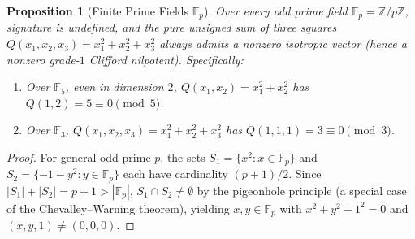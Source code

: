 \documentclass[11pt]{article}
\newtheorem{proposition}[theorem]{Proposition}
\theoremstyle{definition}
\newcommand{\F}{\mathbb{F}}
\newcommand{\Z}{\mathbb{Z}}
\begin{document}
\begin{proposition}[Finite Prime Fields $\F_p$]\label{prop:fp}
Over every odd prime field $\F_p = \Z/p\Z$, signature is undefined, and the pure unsigned
sum of three squares $Q(x_1, x_2, x_3) = x_1^2 + x_2^2 + x_3^2$ always admits a nonzero
isotropic vector (hence a nonzero grade-$1$ Clifford nilpotent). Specifically:
\begin{enumerate}
  \item Over $\F_5$, even in dimension $2$, $Q(x_1, x_2) = x_1^2 + x_2^2$ has $Q(1, 2) = 5 \equiv 0 \pmod 5$.
  \item Over $\F_3$, $Q(x_1, x_2, x_3) = x_1^2 + x_2^2 + x_3^2$ has $Q(1, 1, 1) = 3 \equiv 0 \pmod 3$.
\end{enumerate}
\end{proposition}
\begin{proof}
For general odd prime $p$, the sets $S_1 = \{x^2 : x \in \F_p\}$ and
$S_2 = \{-1 - y^2 : y \in \F_p\}$ each have cardinality $(p + 1)/2$. Since
$|S_1| + |S_2| = p + 1 > |\F_p|$, $S_1 \cap S_2 \ne \emptyset$ by the pigeonhole principle
(a special case of the Chevalley--Warning theorem), yielding $x, y \in \F_p$ with
$x^2 + y^2 + 1^2 = 0$ and $(x, y, 1) \ne (0, 0, 0)$.
\end{proof}
\end{document}
